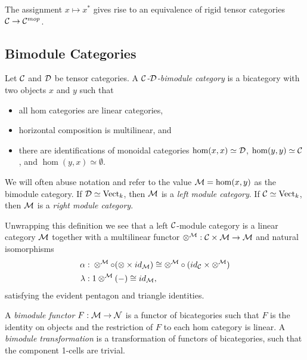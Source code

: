 \documentclass{amsart}
\begin{document}
\begin{remark}
	The assignment $x \mapsto x^*$ gives rise to an equivalence of rigid tensor categories $\mathcal C \to \mathcal C^{mop}$.
\end{remark}

\subsection{Bimodule Categories}

\begin{definition}
	Let $\mathcal C$ and $\mathcal D$ be tensor categories. A {\em $\mathcal C$-$\mathcal D$-bimodule category} is a bicategory with two objects $x$ and $y$ such that
	\begin{itemize}
		\item all hom categories are linear categories, 
		\item horizontal composition is multilinear, and
		\item there are identifications of monoidal categories $\hom(x,x) \simeq \mathcal D$, $\hom(y,y) \simeq \mathcal C$, and $\hom(y,x) \simeq \emptyset$.
	\end{itemize}
	We will often abuse notation and refer to the value $\mathcal M = \hom(x,y)$ as the bimodule category. If $\mathcal D \simeq \mathrm{Vect}_k$, then $\mathcal M$ is a {\em left module category}. If $\mathcal C \simeq \mathrm{Vect}_k$, then $\mathcal M$ is a {\em right module category}.
\end{definition}
	
Unwrapping this definition we see that a left $\mathcal C$-module category is a linear category $\mathcal M$ together with a multilinear functor $\otimes^{\mathcal M}: \mathcal C \times \mathcal M \to \mathcal M$ and natural isomorphisms
	\begin{align*}
		\alpha: & \;    \otimes^{\mathcal M} \circ (\otimes \times id_{\mathcal M}) \cong  \otimes^{\mathcal M} \circ (id_{\mathcal C} \times \otimes^{\mathcal M}) \\
		\lambda: & \; 1 \otimes^{\mathcal M}(-) \cong id_{\mathcal M},
	\end{align*}
	satisfying the evident pentagon and triangle identities. 

\begin{definition}
	A {\em bimodule functor} $F:\mathcal M \to \mathcal N$ is a functor of bicategories such that
		 $F$ is the identity on objects and 
		 the restriction of $F$ to each hom category is linear. 
	A {\em bimodule transformation} is a transformation of functors of bicategories, such that the component 1-cells are trivial. 
\end{definition}
	
\end{document}
